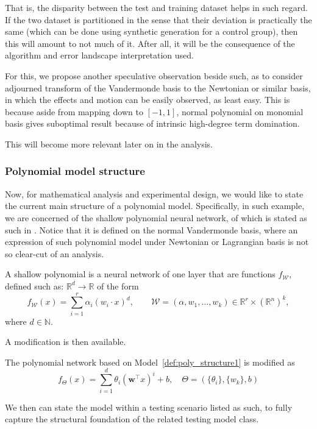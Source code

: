 \documentclass[10pt]{article} %
\begin{document}
That is, the disparity between the test and training dataset helps in such regard. If the two dataset is partitioned in the sense that their deviation is practically the same (which can be done using synthetic generation for a control group), then this will amount to not much of it. After all, it will be the consequence of the algorithm and error landscape interpretation used. 

For this, we propose another speculative observation beside such, as to consider adjourned transform of the Vandermonde basis to the Newtonian or similar basis, in which the effects and motion can be easily observed, as least easy. This is because aside from mapping down to $[-1,1]$, normal polynomial on monomial basis gives suboptimal result because of intrinsic high-degree term domination. 

This will become more relevant later on in the analysis. 

\subsubsection{Polynomial model structure} 

Now, for mathematical analysis and experimental design, we would like to state the current main structure of a polynomial model. Specifically, in such example, we are concerned of the shallow polynomial neural network, of which is stated as such in \cite{arjevani2025geometryoptimizationshallowpolynomial}. Notice that it is defined on the normal Vandermonde basis, where an expression of such polynomial model under Newtonian or Lagrangian basis is not so clear-cut of an analysis.  

\begin{definition}\label{def:poly_structure1}
    A shallow polynomial is a neural network of one layer that are functions $f_{\mathcal W}$, defined such as:
$\mathbb R^d \rightarrow \mathbb{R}$ of the form
\begin{equation}\label{eq:network_model} f_{\mathcal W}(x) = \sum_{i=1}^r
\alpha_{i} (w_i \cdot x)^d, \qquad \mathcal W = (\alpha,w_1,\ldots,w_k) \in
\mathbb{R}^r \times (\mathbb{R}^{n})^k,
\end{equation} 
where $d \in \mathbb{N}$.
\end{definition}
A modification is then available. 
\begin{definition}
    The polynomial network based on Model~\ref{def:poly_structure1} is modified as 
    \begin{equation}
        f_{\Theta}(x) = \sum_{i=1}^{d} \theta_i \left( \mathbf{w}^\top x \right)^i + b, \quad \Theta = (\{\theta_{i}\},\{w_{k}\},b)
    \end{equation}
\end{definition}
We then can state the model within a testing scenario listed as such, to fully capture the structural foundation of the related testing model class. 
\end{document}

